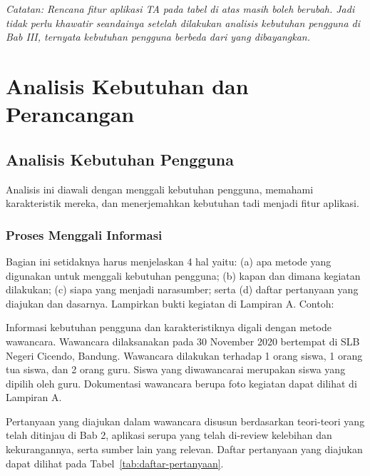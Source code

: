 \documentclass[a4paper,11pt,oneside]{report}
\begin{document}
\noindent\textit{Catatan: Rencana fitur aplikasi TA pada tabel di atas masih
boleh berubah. Jadi tidak perlu khawatir seandainya setelah dilakukan analisis
kebutuhan pengguna di Bab III, ternyata kebutuhan pengguna berbeda dari yang
dibayangkan.}

\chapter{Analisis Kebutuhan dan Perancangan}

\section{Analisis Kebutuhan Pengguna}
Analisis ini diawali dengan menggali kebutuhan pengguna, memahami karakteristik
mereka, dan menerjemahkan kebutuhan tadi menjadi fitur aplikasi.

\subsection{Proses Menggali Informasi}
Bagian ini setidaknya harus menjelaskan 4 hal yaitu: (a) apa metode yang
digunakan untuk menggali kebutuhan pengguna; (b) kapan dan dimana kegiatan
dilakukan; (c) siapa yang menjadi narasumber; serta (d) daftar pertanyaan yang
diajukan dan dasarnya. Lampirkan bukti kegiatan di Lampiran A. Contoh:

Informasi kebutuhan pengguna dan karakteristiknya digali dengan metode
wawancara. Wawancara dilaksanakan pada 30 November 2020 bertempat di SLB Negeri
Cicendo, Bandung. Wawancara dilakukan terhadap 1 orang siswa, 1 orang tua
siswa, dan 2 orang guru. Siswa yang diwawancarai merupakan siswa yang dipilih
oleh guru. Dokumentasi wawancara berupa foto kegiatan dapat dilihat di Lampiran A.

Pertanyaan yang diajukan dalam wawancara disusun berdasarkan teori-teori yang
telah ditinjau di Bab 2, aplikasi serupa yang telah di-review kelebihan dan
kekurangannya, serta sumber lain yang relevan. Daftar pertanyaan yang diajukan
dapat dilihat pada Tabel~\ref{tab:daftar-pertanyaan}.
\end{document}
